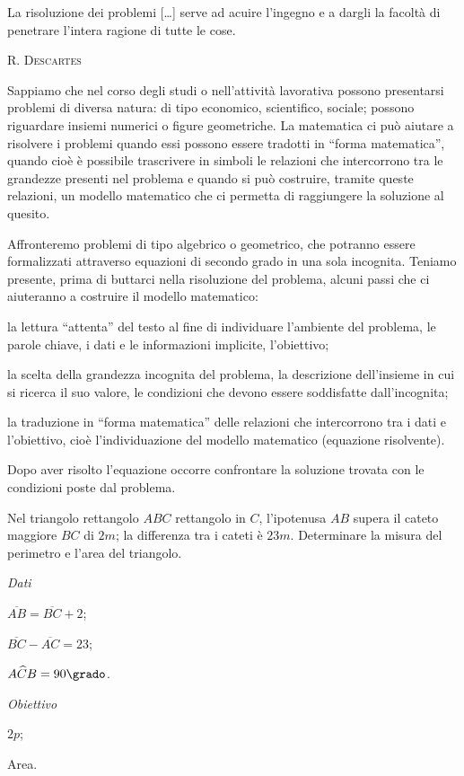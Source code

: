  \epigraph{La risoluzione dei problemi [\ldots] serve ad acuire l'ingegno e a dargli la facoltà di penetrare
 l'intera ragione di tutte le cose.}{{\scshape{R. Descartes}}}

Sappiamo che nel corso degli studi o nell'attività lavorativa possono presentarsi problemi di diversa natura: di tipo economico, scientifico, sociale; possono riguardare insiemi numerici o figure geometriche. La matematica ci può aiutare a risolvere i problemi quando essi possono essere tradotti in ``forma matematica'', quando cioè è possibile trascrivere in simboli le relazioni che intercorrono tra le grandezze presenti nel problema e quando si può costruire, tramite queste relazioni, un modello matematico che ci permetta di raggiungere la soluzione al quesito.

Affronteremo problemi di tipo algebrico o geometrico, che potranno essere formalizzati attraverso equazioni di secondo grado in una sola incognita.
Teniamo presente, prima di buttarci nella risoluzione del problema, alcuni passi che ci aiuteranno a costruire il modello matematico:
\begin{itemize*}
\item la lettura ``attenta'' del testo al fine di individuare l'ambiente del problema, le parole chiave, i dati e le informazioni implicite, l'obiettivo;
\item la scelta della grandezza incognita del problema, la descrizione dell'insieme in cui si ricerca il suo valore, le condizioni che devono essere soddisfatte dall'incognita;
\item la traduzione in ``forma matematica'' delle relazioni che intercorrono tra i dati e l'obiettivo, cioè l'individuazione del modello matematico (equazione risolvente).
\end{itemize*}
Dopo aver risolto l'equazione occorre confrontare la soluzione trovata con le condizioni poste dal problema.

\begin{problema}
Nel triangolo rettangolo $ABC$ rettangolo in $C$, l'ipotenusa $AB$ supera il cateto maggiore $BC$ di $2\unit{m}$; la differenza tra i cateti è $23\unit{m}$. Determinare la misura del perimetro e l'area del triangolo.
\end{problema}

\begin{multicols}{3}
\emph{Dati}

$\overline {AB} = \overline {BC} + 2$;

$\overline {BC} - \overline {AC} = 23$;

$A \widehat {C} B = 90\grado$.

\emph{Obiettivo}

$2p$;

Area.

 
\end{multicols}


